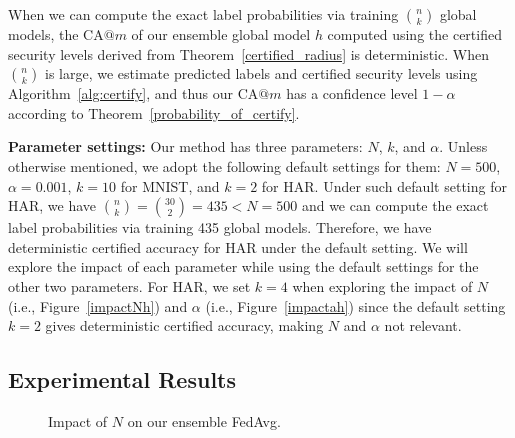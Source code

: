 \documentclass[letterpaper]{article} %
\begin{document}
When we can compute the exact label probabilities via training ${n \choose k}$ global models, the CA$@m$ of our ensemble global model $h$ computed using the certified security levels derived from Theorem~\ref{certified_radius} is deterministic. When ${n \choose k}$ is large, we estimate predicted labels and certified security levels using Algorithm~\ref{alg:certify}, and thus our CA$@m$ has a confidence level $1-\alpha$ according to Theorem~\ref{probability_of_certify}.

\noindent
{\bf Parameter settings:}  Our method has three parameters: $N$, $k$, and $\alpha$. Unless otherwise mentioned, we adopt the following default settings for them: $N=500$, $\alpha=0.001$,  $k=10$ for MNIST, and $k=2$ for HAR.
Under such default setting for HAR, we have ${n \choose k}={30 \choose 2} = 435 < N=500$ and  we can compute the exact label probabilities via training 435 global models. Therefore, we have deterministic certified accuracy for HAR under the default setting. We will explore the impact of each parameter while using the default settings for the other two parameters. For HAR, we set $k=4$ when exploring the impact of $N$ (i.e., Figure~\ref{impactNh}) and $\alpha$ (i.e., Figure~\ref{impactah}) since the default setting $k=2$ gives deterministic certified accuracy, making $N$ and $\alpha$ not relevant.

\subsection{Experimental Results}

\begin{figure}[!t]
    \center
    \caption{Impact of $N$ on our ensemble FedAvg.}
    \label{fig:N}
\end{figure}
\end{document}
